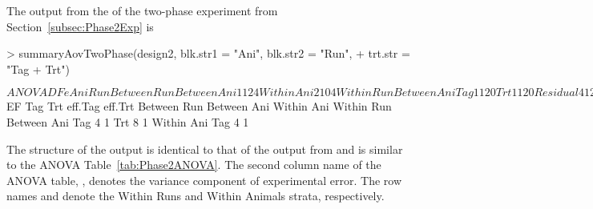 \documentclass[article]{jss}
\begin{document}
The output from the  of the two-phase experiment from Section~\ref{subsec:Phase2Exp} is
\begin{CodeChunk}
\begin{CodeInput}
> summaryAovTwoPhase(design2, blk.str1 = "Ani", blk.str2 = "Run", 
+ trt.str = "Tag + Trt")                                      
\end{CodeInput}
\begin{CodeOutput}
$ANOVA
               DF e Ani Run
Between Run                
   Between Ani 1  1 2   4  
   Within Ani  2  1 0   4  
Within Run                 
   Between Ani             
      Tag      1  1 2   0  
      Trt      1  1 2   0  
      Residual 4  1 2   0  
   Within Ani              
      Tag      2  1 0   0  
      Residual 4  1 0   0  
$EF
               Tag Trt eff.Tag eff.Trt
Between Run                           
   Between Ani                        
   Within Ani                         
Within Run                            
   Between Ani                        
      Tag      4       1              
      Trt          8           1      
   Within Ani                         
      Tag      4       1              
\end{CodeOutput}
\end{CodeChunk}
The structure of the output is identical to that of the output from  and is similar to the ANOVA Table~\ref{tab:Phase2ANOVA}. The second column name of the ANOVA table, , denotes the variance component of experimental error. The row names  and  denote the Within Runs and Within Animals strata, respectively. 
\end{document}
